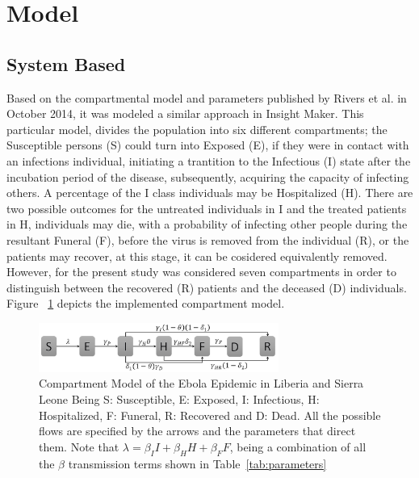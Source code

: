 \documentclass[10pt]{article}
\begin{document}
\section{Model}\label{sec:Model}
%
%
\subsection{System Based}
Based on the compartmental model and parameters published by Rivers et al.\cite{Rivers2014} in October 2014, it was modeled a similar approach in Insight Maker.  This particular model, divides the population into six different compartments; the Susceptible persons (S) could turn into Exposed (E), if they were in contact with an infections individual, initiating a trantition to the Infectious (I) state after the incubation period of the disease, subsequently, acquiring the capacity of infecting others. A percentage of the I class individuals may be Hospitalized (H). There are two possible outcomes for the untreated individuals in I and the treated patients in H, individuals may die, with a probability of infecting other people during the resultant Funeral (F), before the virus is removed from the individual (R), or the patients may recover, at this stage, it can be cosidered equivalently removed. However, for the present study was considered seven compartments in order to distinguish between the recovered (R) patients and the deceased (D) individuals. Figure ~\ref{fig:compartment} depicts the implemented compartment model. \\

\begin{figure}
  \centering
  \includegraphics[width=0.7\textwidth]{compartment}
  \caption{Compartment Model of the Ebola Epidemic in Liberia and Sierra Leone \newline  Being S: Susceptible, E: Exposed, I: Infectious, H: Hospitalized, F: Funeral,  R: Recovered and D: Dead. All the possible flows are specified by the arrows and the parameters that direct them. Note that $\lambda = \beta_{I}I+\beta_{H}H+\beta_{F}F $, being a combination of all the $\beta$ transmission terms shown in Table~\ref{tab:parameters}} 
\label{fig:compartment} 
\end{figure}
\end{document}
